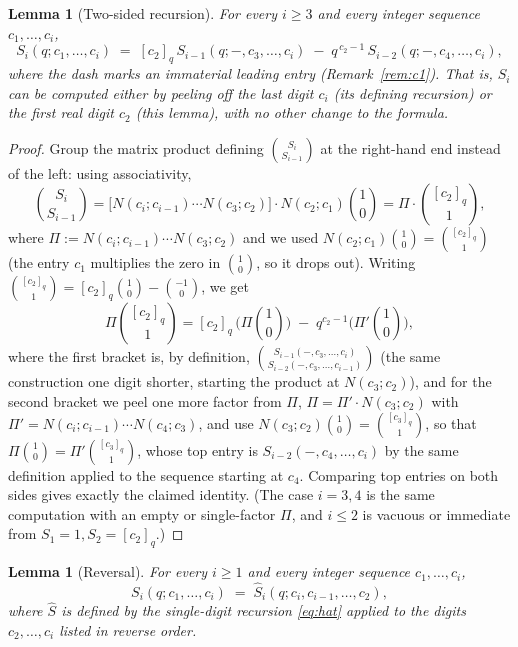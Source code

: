 \documentclass[11pt]{article}
\newtheorem{lemma}[theorem]{Lemma}
\theoremstyle{remark}
\newcommand{\qint}[1]{[#1]_q}
\begin{document}
\begin{lemma}[Two-sided recursion]\label{lem:twosided}
For every $i\ge3$ and every integer sequence $c_1,\dots,c_i$,
\[
S_i(q;c_1,\dots,c_i) \;=\; \qint{c_2}\,S_{i-1}(q;-,c_3,\dots,c_i) \;-\; q^{\,c_2-1}\,S_{i-2}(q;-,c_4,\dots,c_i),
\]
where the dash marks an immaterial leading entry (Remark~\ref{rem:c1}). That is, $S_i$ can be
computed either by peeling off the \emph{last} digit $c_i$ (its defining recursion) or the
\emph{first real} digit $c_2$ (this lemma), with no other change to the formula.
\end{lemma}

\begin{proof}
Group the matrix product defining $\binom{S_i}{S_{i-1}}$ at the right-hand end instead of the
left: using associativity,
\[
\binom{S_i}{S_{i-1}} = \Big[N(c_i;c_{i-1})\cdots N(c_3;c_2)\Big]\cdot N(c_2;c_1)\binom10
= \Pi\cdot\binom{\qint{c_2}}{1},
\]
where $\Pi:=N(c_i;c_{i-1})\cdots N(c_3;c_2)$ and we used $N(c_2;c_1)\binom10=\binom{\qint{c_2}}1$
(the entry $c_1$ multiplies the zero in $\binom10$, so it drops out). Writing
$\binom{\qint{c_2}}1=\qint{c_2}\binom10-\binom{-1}0$, we get
\[
\Pi\binom{\qint{c_2}}{1} = \qint{c_2}\,\Big(\Pi\binom{1}{0}\Big) \;-\; q^{c_2-1}\Big(\Pi'\binom10\Big),
\]
where the first bracket is, by definition, $\binom{S_{i-1}(-,c_3,\dots,c_i)}{S_{i-2}(-,c_3,\dots,c_{i-1})}$
(the same construction one digit shorter, starting the product at $N(c_3;c_2)$), and for the
second bracket we peel one more factor from $\Pi$, $\Pi=\Pi'\cdot N(c_3;c_2)$ with
$\Pi'=N(c_i;c_{i-1})\cdots N(c_4;c_3)$, and use $N(c_3;c_2)\binom10=\binom{\qint{c_3}}1$, so that
$\Pi\binom10=\Pi'\binom{\qint{c_3}}1$, whose top entry is $S_{i-2}(-,c_4,\dots,c_i)$ by the same
definition applied to the sequence starting at $c_4$. Comparing top entries on both sides gives
exactly the claimed identity. (The case $i=3,4$ is the same computation with an empty or
single-factor $\Pi$, and $i\le2$ is vacuous or immediate from $S_1=1,S_2=[c_2]_q$.)
\end{proof}

\begin{lemma}[Reversal]\label{lem:reversal}
For every $i\ge1$ and every integer sequence $c_1,\dots,c_i$,
\[
S_i(q;c_1,\dots,c_i) \;=\; \hat S_i(q;c_i,c_{i-1},\dots,c_2),
\]
where $\hat S$ is defined by the single-digit recursion \eqref{eq:hat} applied to the digits
$c_2,\dots,c_i$ listed in reverse order.
\end{lemma}
\end{document}

